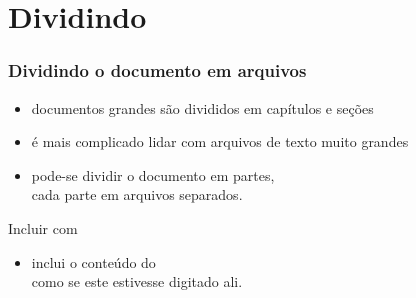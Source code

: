 
\section{Dividindo}

\begin{frame}
  \frametitle{Dividindo o documento em arquivos}

  \begin{itemize}
  \item documentos grandes são divididos em capítulos e seções
  \item é mais complicado lidar com arquivos de texto muito grandes
  \item pode-se dividir o documento em partes,\\
    cada parte em arquivos separados.
  \end{itemize}

  \begin{block}{Incluir com \texttt{\string}}
    \medskip
    \texttt{\blue{\string}\qquad 
      }
    \medskip
    \begin{itemize}
    \item inclui o conteúdo do
      \\
      como se este estivesse digitado ali.
    \end{itemize}
  \end{block}

\end{frame}

